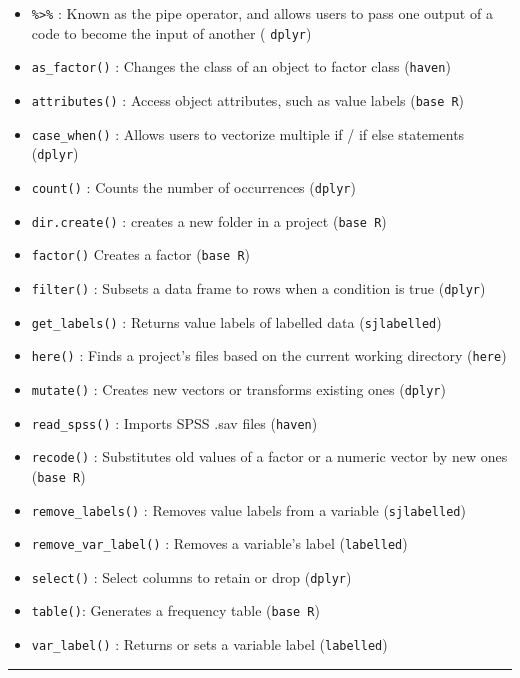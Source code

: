 \documentclass[
]{book}
\providecommand{\tightlist}{%
  \setlength{\itemsep}{0pt}\setlength{\parskip}{0pt}}
\begin{document}
\begin{itemize}
\tightlist
\item
  \texttt{\%\textgreater{}\%} : Known as the pipe operator, and allows users to pass one output of a code to become the input of another ( \texttt{dplyr})
\item
  \texttt{as\_factor()} : Changes the class of an object to factor class (\texttt{haven})
\item
  \texttt{attributes()} : Access object attributes, such as value labels (\texttt{base\ R})
\item
  \texttt{case\_when()} : Allows users to vectorize multiple if / if else statements (\texttt{dplyr})
\item
  \texttt{count()} : Counts the number of occurrences (\texttt{dplyr})
\item
  \texttt{dir.create()} : creates a new folder in a project (\texttt{base\ R})
\item
  \texttt{factor()} Creates a factor (\texttt{base\ R})
\item
  \texttt{filter()} : Subsets a data frame to rows when a condition is true (\texttt{dplyr})
\item
  \texttt{get\_labels()} : Returns value labels of labelled data (\texttt{sjlabelled})
\item
  \texttt{here()} : Finds a project's files based on the current working directory (\texttt{here})
\item
  \texttt{mutate()} : Creates new vectors or transforms existing ones (\texttt{dplyr})
\item
  \texttt{read\_spss()} : Imports SPSS .sav files (\texttt{haven})
\item
  \texttt{recode()} : Substitutes old values of a factor or a numeric vector by new ones (\texttt{base\ R})
\item
  \texttt{remove\_labels()} : Removes value labels from a variable (\texttt{sjlabelled})
\item
  \texttt{remove\_var\_label()} : Removes a variable's label (\texttt{labelled})
\item
  \texttt{select()} : Select columns to retain or drop (\texttt{dplyr})
\item
  \texttt{table()}: Generates a frequency table (\texttt{base\ R})
\item
  \texttt{var\_label()} : Returns or sets a variable label (\texttt{labelled})
\end{itemize}

\begin{center}\rule{0.5\linewidth}{0.5pt}\end{center}
\end{document}
